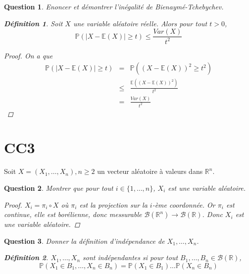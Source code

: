 \documentclass{article}
\theoremstyle{plain}
\newtheorem{question}{Question}
\theoremstyle{definition}
\newtheorem{definition}{Définition}
\begin{document}
\begin{question}
	Enoncer et démontrer l'inégalité de Bienaymé-Tchebychev.
	\begin{definition}
		Soit $X$ une variable aléatoire réelle. Alors pour tout $t > 0$,
		\begin{equation*}
			\mathbb{P} (|X - \mathbb{E} (X)| \geq t) \le \frac{Var(X)}{t^2}
		\end{equation*}
		\begin{proof}
			On a que
			\begin{eqnarray*}
				\mathbb{P} (|X - \mathbb{E} (X)| \geq t) &=& \mathbb{P} ((X - \mathbb{E} (X))^2 \geq t^2) \\
				&\le& \frac{\mathbb{E} ((X - \mathbb{E} (X))^2)}{t^2} \\
				&=& \frac{Var(X)}{t^2}
			\end{eqnarray*}
		\end{proof}
	\end{definition}
\end{question}



\section{CC3}

Soit $X = (X_1, \dots, X_n), n \geq 2$ un vecteur aléatoire à valeurs dans $\mathbb{R}^n$.

\begin{question}
	Montrer que pour tout $i \in \{1, \dots, n\}$, $X_i$ est une variable aléatoire.
	\begin{proof}
		$X_i = \pi_i \circ X$ où $\pi_i$ est la projection sur la $i$-ème coordonnée. Or $\pi_i$ est continue,
		elle est borélienne, donc messurable $\mathscr{B} (\mathbb{R}^n) \to \mathscr{B} (\mathbb{R})$.
		Donc $X_i$ est une variable aléatoire.
	\end{proof}
\end{question}

\begin{question}
	Donner la définition d'indépendance de $X_1, \dots, X_n$.
	\begin{definition}
		$X_1, \dots, X_n$ sont indépendantes si pour tout $B_1, \dots, B_n \in \mathscr{B} (\mathbb{R})$,
		\begin{equation*}
			\mathbb{P} (X_1 \in B_1, \dots, X_n \in B_n) = \mathbb{P} (X_1 \in B_1) \dots \mathbb{P} (X_n \in B_n)
		\end{equation*}
	\end{definition}
\end{question}
\end{document}
